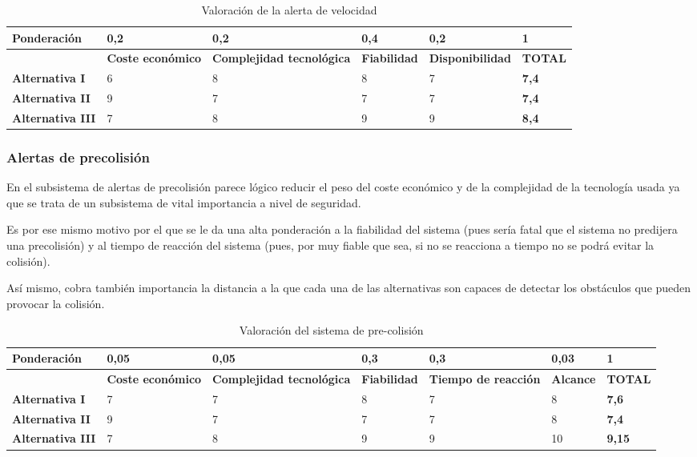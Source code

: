\begin{table}[H]
\begin{center}
\begin{tabular}{p{} p{} p{} p{} p{} p{} }
Ponderación & 0,2 & 0,2 & 0,4 & 0,2 & 1 \\ \hline \hline
 & \textbf{Coste económico} & \textbf{Complejidad tecnológica} & \textbf{Fiabilidad} & \textbf{Disponibilidad} & \textbf{TOTAL}\\
\hline \hline
\textbf{Alternativa I} & 6 & 8 & 8 & 7 & \textbf{7,4}  \\
\hline
\textbf{Alternativa II} & 9 & 7 & 7 & 7 & \textbf{7,4}  \\
\hline
\textbf{Alternativa III} & 7 & 8 & 9 & 9 & \textbf{8,4} \\ \hline
\end{tabular}
\caption{Valoración de la alerta de velocidad}
\label{tab:valSisVel}
\end{center}
\end{table}

\subsubsection{Alertas de precolisión}
\par En el subsistema de alertas de precolisión parece lógico reducir el peso del coste económico y de la complejidad de la tecnología usada ya que se trata de un subsistema de vital importancia a nivel de seguridad.
\par Es por ese mismo motivo por el que se le da una alta ponderación a la fiabilidad del sistema (pues sería fatal que el sistema no predijera una precolisión) y al tiempo de reacción del sistema (pues, por muy fiable que sea, si no se reacciona a tiempo no se podrá evitar la colisión).
\par Así mismo, cobra también importancia la distancia a la que cada una de las alternativas son capaces de detectar los obstáculos que pueden provocar la colisión.
\begin{table}[H]
\begin{center}
\begin{tabular}{p{} p{} p{} p{} p{} p{} p{}}
Ponderación & 0,05 & 0,05 & 0,3 & 0,3 & 0,03 & 1 \\ \hline \hline
 & \textbf{Coste económico} & \textbf{Complejidad tecnológica} & \textbf{Fiabilidad} & \textbf{Tiempo de reacción} & \textbf{Alcance} & \textbf{TOTAL} \\
\hline \hline
\textbf{Alternativa I} & 7 & 7 & 8 & 7 & 8 & \textbf{7,6}  \\
\hline
\textbf{Alternativa II} & 9 & 7 & 7 & 7 & 8 & \textbf{7,4}  \\
\hline
\textbf{Alternativa III} & 7 & 8 & 9 & 9 & 10 & \textbf{9,15} \\ \hline
\end{tabular}
\caption{Valoración del sistema de pre-colisión}
\label{tab:valSisPreCol}
\end{center}
\end{table}




